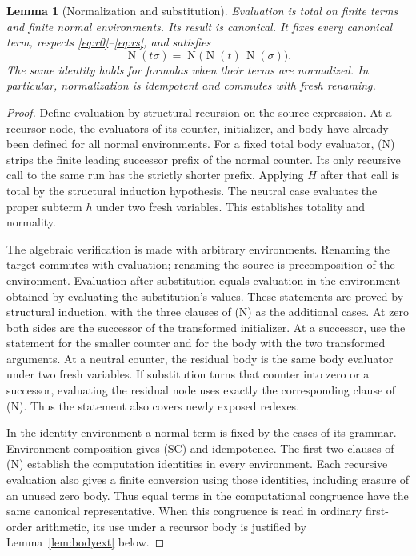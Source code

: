 \documentclass[11pt]{article}
\newtheorem{lemma}[theorem]{Lemma}
\theoremstyle{definition}
\theoremstyle{remark}
\newcommand{\NF}{\operatorname{N}}
\begin{document}
\begin{lemma}[Normalization and substitution]
\label{lem:nf}
Evaluation is total on finite terms and finite normal environments.
Its result is canonical. It fixes every canonical term, respects
\eqref{eq:r0}--\eqref{eq:rs}, and satisfies
\[
 \NF(t\sigma)=\NF\bigl(\NF(t)\,\NF(\sigma)\bigr).               \tag{SC}
\]
The same identity holds for formulas when their terms are normalized.
In particular, normalization is idempotent and commutes with fresh
renaming.
\end{lemma}
\begin{proof}
Define evaluation by structural recursion on the source expression.
At a recursor node, the evaluators of its counter, initializer, and
body have already been defined for all normal environments.
For a fixed total body evaluator, (N) strips the finite leading
successor prefix of the normal counter. Its only recursive call
to the same run has the strictly shorter prefix. Applying $H$
after that call is total by the structural induction hypothesis.
The neutral case evaluates the proper subterm $h$ under two fresh
variables. This establishes totality and normality.

The algebraic verification is made with arbitrary environments.
Renaming the target commutes with evaluation; renaming the source
is precomposition of the environment. Evaluation after substitution
equals evaluation in the environment obtained by evaluating the
substitution's values. These statements are proved by structural
induction, with the three clauses of (N) as the additional cases.
At zero both sides are the successor of the transformed
initializer. At a successor, use the statement for the smaller
counter and for the body with the two transformed arguments.
At a neutral counter, the residual body is the same body evaluator
under two fresh variables. If substitution turns that counter into
zero or a successor, evaluating the residual node uses exactly the
corresponding clause of (N). Thus the statement also covers newly
exposed redexes.

In the identity environment a normal term is fixed by the cases
of its grammar. Environment composition gives (SC) and
idempotence. The first two clauses of (N) establish the
computation identities in every environment. Each recursive
evaluation also gives a finite conversion using those identities,
including erasure of an unused zero body. Thus equal terms in the
computational congruence have the same canonical representative.
When this congruence is read in ordinary first-order arithmetic,
its use under a recursor body is justified by
Lemma~\ref{lem:bodyext} below.
\end{proof}
\end{document}

